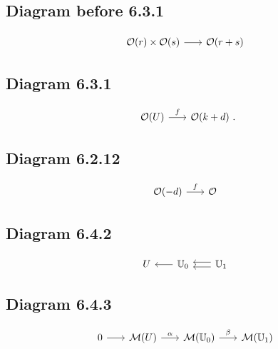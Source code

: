 \documentclass[leqno]{amsart}
\begin{document}
	\subsection*{Diagram before 6.3.1}

	\begin{equation*}
		\begin{tikzcd}[sep=scriptsize]
			\mathcal{O}(r) \times \mathcal{O}(s) \arrow{r}  & \mathcal{O}(r+s) 
		\end{tikzcd}
	\end{equation*}

	\subsection*{Diagram 6.3.1}

	\begin{equation*}
		\begin{tikzcd}[sep=scriptsize]
			\mathcal{O}(U) \arrow{r}{f} & \mathcal{O}(k+d) \rlap{\  .}
		\end{tikzcd}
	\end{equation*}

	\subsection*{Diagram 6.2.12}

	\begin{equation*}
		\begin{tikzcd}[sep=scriptsize]
			\mathcal{O}(-d) \arrow{r}{f} & \mathcal{O}
		\end{tikzcd}
	\end{equation*}

	\subsection*{Diagram 6.4.2}

	\begin{equation*}
		\begin{tikzcd}[sep=scriptsize]
			U &  \arrow{l} \mathbb{U}_0 & \mathbb{U}_1 \arrow[shift right]{l} \arrow[shift left]{l} 
		\end{tikzcd}
	\end{equation*}

	\subsection*{Diagram 6.4.3}

	\begin{equation*}
		\begin{tikzcd}[sep=scriptsize]
			0 \arrow{r} & \mathcal{M}(U) \arrow{r}{\alpha} & \mathcal{M}(\mathbb{U}_0) \arrow{r}{\beta} & \mathcal{M}(\mathbb{U}_1)
		\end{tikzcd}
	\end{equation*}
\end{document}
